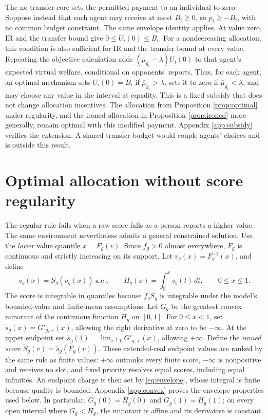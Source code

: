 \documentclass[11pt]{article}
\begin{document}
The no-transfer core sets the permitted payment to an individual to zero. Suppose instead that each agent may receive at most $B_i\ge0$, so $p_i\ge-B_i$, with no common budget constraint. The same envelope identity applies. At value zero, IR and the transfer bound give $0\le U_i(0)\le B_i$. For a nondecreasing allocation, this condition is also sufficient for IR and the transfer bound at every value. Repeating the objective calculation adds $(\bar\mu_{g_i}-\lambda)U_i(0)$ to that agent's expected virtual welfare, conditional on opponents' reports. Thus, for each agent, an optimal mechanism sets $U_i(0)=B_i$ if $\bar\mu_{g_i}>\lambda$, sets it to zero if $\bar\mu_{g_i}<\lambda$, and may choose any value in the interval at equality. This is a fixed subsidy that does not change allocation incentives. The allocation from Proposition \ref{prop:optimal} under regularity, and the ironed allocation in Proposition \ref{prop:ironed} more generally, remain optimal with this modified payment. Appendix \ref{app:subsidy} verifies the extension. A shared transfer budget would couple agents' choices and is outside this result.

\section{Optimal allocation without score regularity}\label{sec:ironing}

The regular rule fails when a raw score falls as a person reports a higher value. The same environment nevertheless admits a general constrained solution. Use the \emph{lower} value quantile $x=F_g(v)$. Since $f_g>0$ almost everywhere, $F_g$ is continuous and strictly increasing on its support. Let $v_g(x)=F_g^{-1}(x)$, and define
\begin{equation}\label{eq:irondef}
s_g(x)=S_g(v_g(x))\ \text{a.e.},\qquad
H_g(x)=\int_0^x s_g(t)\,dt,\qquad 0\le x\le1.
\end{equation}
The score is integrable in quantiles because $f_gS_g$ is integrable under the model's bounded-value and finite-mean assumptions. Let $G_g$ be the greatest convex minorant of the continuous function $H_g$ on $[0,1]$. For $0\le x<1$, set $\widetilde s_g(x)=G'_{g,+}(x)$, allowing the right derivative at zero to be $-\infty$. At the upper endpoint set $\widetilde s_g(1)=\lim_{x\uparrow1}G'_{g,+}(x)$, allowing $+\infty$. Define the \emph{ironed score} $\widetilde S_g(v)=\widetilde s_g(F_g(v))$. These extended-real endpoint values are ranked by the same rule as finite values: $+\infty$ outranks every finite score, $-\infty$ is nonpositive and receives no slot, and fixed priority resolves equal scores, including equal infinities. An endpoint charge is then set by \eqref{eq:envelope}, whose integral is finite because quality is bounded. Appendix \ref{app:convex} proves the envelope properties used below. In particular, $G_g(0)=H_g(0)$ and $G_g(1)=H_g(1)$; on every open interval where $G_g<H_g$, the minorant is affine and its derivative is constant.
\end{document}
